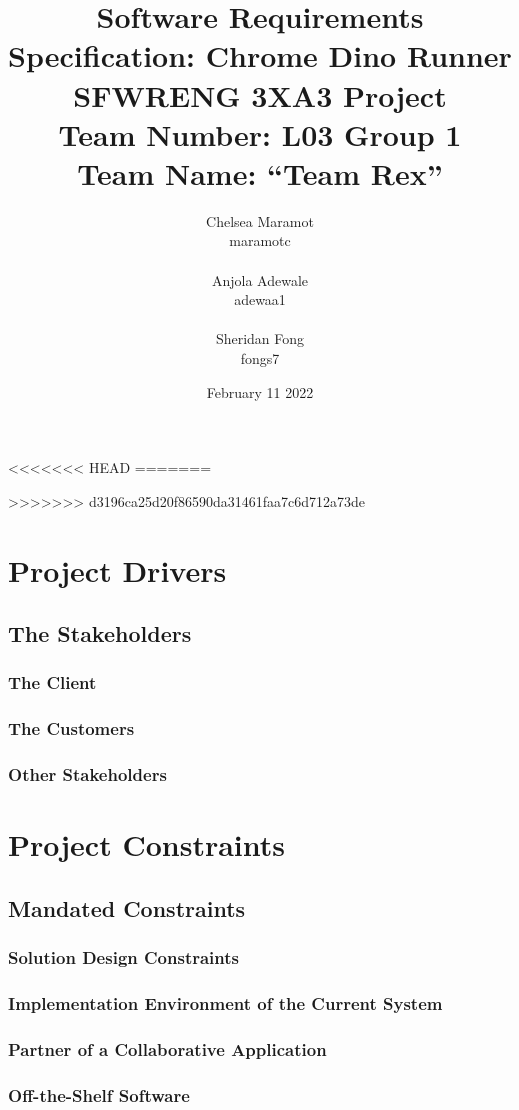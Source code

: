\documentclass{article}
\title{Software Requirements Specification: Chrome Dino Runner \\ \bigskip \large SFWRENG 3XA3 Project \\ \bigskip \large Team Number: L03 Group 1 \\ \large Team Name: ``Team Rex'' }
\author{Chelsea Maramot \\ maramotc \\ \\ Anjola Adewale \\ adewaa1 \\ \\ Sheridan Fong \\ fongs7 }
\date{February 11 2022}
\begin{document}
\maketitle
<<<<<<< HEAD
=======

>>>>>>> d3196ca25d20f86590da31461faa7c6d712a73de
\section{Project Drivers}
\subsection{The Stakeholders}
\subsubsection{The Client}
\subsubsection{The Customers}
\subsubsection{Other Stakeholders}



\section{Project Constraints}

\subsection{Mandated Constraints}
\subsubsection{Solution Design Constraints}
\subsubsection{Implementation Environment of the Current System}
\subsubsection{Partner of a Collaborative Application}
\subsubsection{Off-the-Shelf Software}
\end{document}
